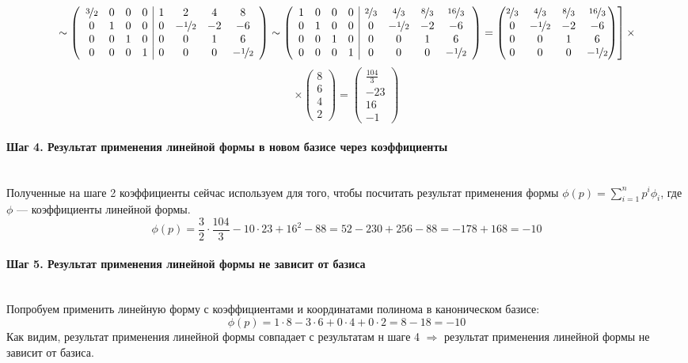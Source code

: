 \documentclass{article}
\begin{document}
$$\left.\sim \left(\begin{array}{cccc|cccc}
\nicefrac{3}{2} & 0 & 0 & 0 & 1 & 2 & 4 & 8 \\
0 & 1 & 0 & 0 & 0 & -\nicefrac{1}{2} & -2 & -6 \\
0 & 0 & 1 & 0 & 0 & 0 & 1 & 6 \\
0 & 0 & 0 & 1 & 0 & 0 & 0 & -\nicefrac{1}{2} \\
\end{array}\right)\sim \left(\begin{array}{cccc|cccc}
1 & 0 & 0 & 0 & \nicefrac{2}{3} & \nicefrac{4}{3} & \nicefrac{8}{3} & \nicefrac{16}{3} \\
0 & 1 & 0 & 0 & 0 & -\nicefrac{1}{2} & -2 & -6 \\
0 & 0 & 1 & 0 & 0 & 0 & 1 & 6 \\
0 & 0 & 0 & 1 & 0 & 0 & 0 & -\nicefrac{1}{2} \\
\end{array}\right) = \begin{pmatrix}
\nicefrac{2}{3} & \nicefrac{4}{3} & \nicefrac{8}{3} & \nicefrac{16}{3} \\
0 & -\nicefrac{1}{2} & -2 & -6 \\
0 & 0 & 1 & 6 \\
 0 & 0 & 0 & -\nicefrac{1}{2}
\end{pmatrix}\right] \times$$
$$\times \begin{pmatrix}
8 \\ 6 \\ 4 \\ 2
\end{pmatrix} = \begin{pmatrix}
\frac{104}{3} \\-23 \\16 \\-1
\end{pmatrix}$$
\paragraph*{Шаг 4. Результат применения линейной формы в новом базисе через коэффициенты} \, \\
Полученные на шаге 2 коэффициенты сейчас используем для того, чтобы посчитать результат применения формы $\phi(p)=\sum\limits_{i=1}^np^i\phi_i$, где $\phi$ --- коэффициенты линейной формы.
$$\phi(p)=\frac{3}{2}\cdot\frac{104}{3}-10\cdot23+16^2-88 = 52-230+256-88 = -178+168 = -10$$
\paragraph*{Шаг 5. Результат применения линейной формы не зависит от базиса} \, \\
Попробуем применить линейную форму с коэффициентами и координатами полинома в каноническом базисе:
$$\phi(p)=1\cdot8-3\cdot6+0\cdot4+0\cdot2 = 8 - 18 = -10$$
Как видим, результат применения линейной формы совпадает с результатам н шаге 4 $\Rightarrow$ результат применения линейной формы не зависит от базиса.
\end{document}
